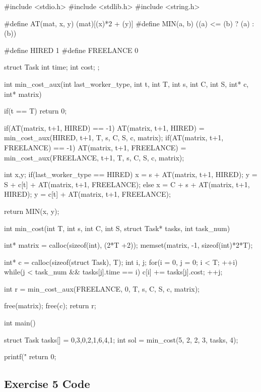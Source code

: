\documentclass[paper=a4, fontsize=11pt]{scrartcl} %
\numberwithin{equation}{section} %
\numberwithin{figure}{section} %
\numberwithin{table}{section} %
\begin{document}
\begin{ccode}
#include <stdio.h>
#include <stdlib.h>
#include <string.h>

#define AT(mat, x, y) (mat)[(x)*2 + (y)]
#define MIN(a, b) ((a) <= (b) ? (a) : (b))

#define HIRED 1
#define FREELANCE 0

struct Task
{
    int time;
    int cost;
};

int min_cost_aux(int last_worker_type, int t, int T, int s, int C, int S, int* c, int* matrix)
{
  if(t == T)
    return 0;
  
  if(AT(matrix, t+1, HIRED) == -1)
    AT(matrix, t+1, HIRED) = min_cost_aux(HIRED, t+1, T, s, C, S, c, matrix);
  if(AT(matrix, t+1, FREELANCE) == -1)
    AT(matrix, t+1, FREELANCE) = min_cost_aux(FREELANCE, t+1, T, s, C, S, c, matrix);
  
  int x,y;
  if(last_worker_type == HIRED) {
    x = s + AT(matrix, t+1, HIRED);
    y = S + c[t] + AT(matrix, t+1, FREELANCE);
  }
  else {
    x = C + s + AT(matrix, t+1, HIRED);
    y = c[t] + AT(matrix, t+1, FREELANCE);
  }
  
  return MIN(x, y);
}


int min_cost(int T, int s, int C, int S, struct Task* tasks, int task_num)
{
    int* matrix = calloc(sizeof(int), (2*T +2));
    memset(matrix, -1, sizeof(int)*2*T);
    
    int* c = calloc(sizeof(struct Task), T);
    int i, j;
    for(i = 0, j = 0; i < T; ++i) {
        while(j < task_num && tasks[j].time == i) {
            c[i] += tasks[j].cost;
            ++j;
        }
    }
    
    int r = min_cost_aux(FREELANCE, 0, T, s, C, S, c, matrix);
    
    free(matrix);
    free(c);
    return r;
}

int main()
{
    struct Task tasks[] = {{0,3},{0,2},{1,6},{4,1}};
    int sol = min_cost(5, 2, 2, 3, tasks, 4);
    
    printf("%
    return 0;
}
\end{ccode}

\newpage

\subsection*{Exercise 5 Code}
\end{document}
